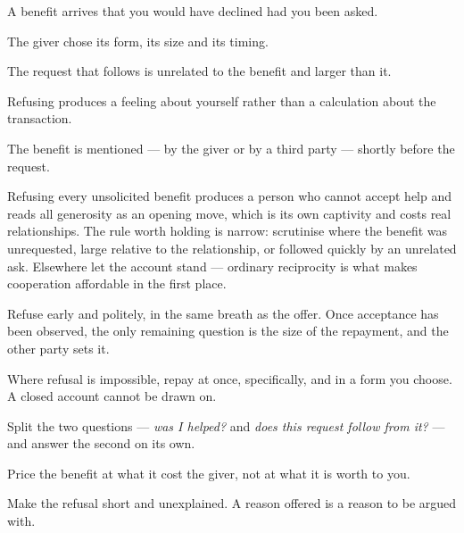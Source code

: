 \begin{feedback}
  \item A benefit arrives that you would have declined had you been asked.
  \item The giver chose its form, its size and its timing.
  \item The request that follows is unrelated to the benefit and larger than it.
  \item Refusing produces a feeling about yourself rather than a calculation about the transaction.
  \item The benefit is mentioned --- by the giver or by a third party --- shortly before the request.
\end{feedback}

\begin{failure}
Refusing every unsolicited benefit produces a person who cannot accept help and reads all generosity as an opening move, which is its own captivity and costs real relationships. The rule worth holding is narrow: scrutinise where the benefit was unrequested, large relative to the relationship, or followed quickly by an unrelated ask. Elsewhere let the account stand --- ordinary reciprocity is what makes cooperation affordable in the first place.
\end{failure}

\begin{countermeasures}
  \item Refuse early and politely, in the same breath as the offer. Once acceptance has been observed, the only remaining question is the size of the repayment, and the other party sets it.
  \item Where refusal is impossible, repay at once, specifically, and in a form you choose. A closed account cannot be drawn on.
  \item Split the two questions --- \emph{was I helped?} and \emph{does this request follow from it?} --- and answer the second on its own.
  \item Price the benefit at what it cost the giver, not at what it is worth to you.
  \item Make the refusal short and unexplained. A reason offered is a reason to be argued with.
\end{countermeasures}

\seesources
{}
